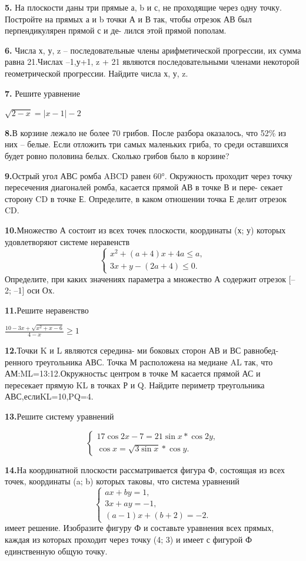 \documentclass[10pt,onecolumn,a4paper]{article}
\begin{document}
\begin{multicols}{3}
\textbf{5.} На плоскости даны три прямые а, b и с, не проходящие через одну
точку. Постройте на прямых а и b точки А и В так, чтобы отрезок АВ был перпендикулярен прямой с и де- лился этой прямой пополам.

\textbf{6.} Числа х, у, z – последовательные члены арифметической прогрессии, их сумма равна 21.Числах –1,у+1, z + 21 являются последовательными членами некоторой геометрической прогрессии. Найдите числа х, у, z.

\textbf{7.} Решите уравнение
\begin{center}
$\sqrt{2-x}=|x-1|-2$
\end{center}
\textbf{8.}В корзине лежало не более 70 грибов. После разбора оказалось, что 52\% из них – белые. Если отложить три самых маленьких гриба, то среди оставшихся будет ровно половина белых. Сколько грибов было в корзине?

\textbf{9.}Острый угол АВС ромба ABCD равен 60°. Окружность проходит через точку пересечения диагоналей ромба, касается прямой АВ в точке В и пере- секает сторону CD в точке Е. Определите, в каком отношении точка Е делит отрезок CD.

\textbf{10.}Множество А состоит из всех точек плоскости, координаты (х; у) которых удовлетворяют системе неравенств
\[\begin{cases}
x^2+(a+4)x+4a\leq a ,\\
3x+y-(2a+4)\leq 0.
\end{cases}
\]
Определите, при каких значениях параметра а множество А содержит отрезок [–2; –1] оси Ох.

\textbf{11.}Решите неравенство
\begin{center}
$\frac{10-3x+\sqrt{x^2+x-6}}{4-x}\geq1$
\end{center}

\textbf{12.}Точки K и L являются середина- ми боковых сторон АВ и ВС равнобед- ренного треугольника АВС. Точка М расположена на медиане AL так, что АМ:ML=13:12.Окружностьс центром в точке М касается прямой АС и пересекает прямую KL в точках Р и Q. Найдите периметр треугольника АВС,еслиKL=10,PQ=4.

\begin{left}
\textbf{13.}Решите систему уравнений
\end{left}
\[\begin{cases}
17 \cos{2x} - 7 = 21\sin{x}*\cos{2y},\\
\cos{x}=\sqrt{3\sin{x}}*\cos{y}.
\end{cases}
\]

\textbf{14.}На координатной плоскости рассматривается фигура Ф, состоящая из всех точек, координаты (a; b) которых таковы, что система уравнений
\[\begin{cases}
ax+by=1,\\
3x+ay=-1,\\
(a-1)x+(b+2)=-2.
\end{cases}
\] 
имеет решение. Изобразите фигуру Ф и составьте уравнения всех прямых, каждая из которых проходит через точку (4; 3) и имеет с фигурой Ф единственную общую точку.


\end{multicols}
\end{document}
